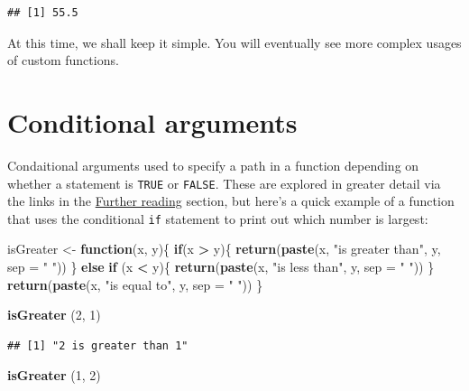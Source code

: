 \documentclass[
]{book}
\newenvironment{Shaded}{\begin{snugshade}}{\end{snugshade}}
\newcommand{\AttributeTok}[1]{\textcolor[rgb]{0.13,0.29,0.53}{#1}}
\newcommand{\ControlFlowTok}[1]{\textcolor[rgb]{0.13,0.29,0.53}{\textbf{#1}}}
\newcommand{\DecValTok}[1]{\textcolor[rgb]{0.00,0.00,0.81}{#1}}
\newcommand{\FunctionTok}[1]{\textcolor[rgb]{0.13,0.29,0.53}{\textbf{#1}}}
\newcommand{\NormalTok}[1]{#1}
\newcommand{\OtherTok}[1]{\textcolor[rgb]{0.56,0.35,0.01}{#1}}
\newcommand{\SpecialCharTok}[1]{\textcolor[rgb]{0.81,0.36,0.00}{\textbf{#1}}}
\newcommand{\StringTok}[1]{\textcolor[rgb]{0.31,0.60,0.02}{#1}}
\begin{document}
\begin{verbatim}
## [1] 55.5
\end{verbatim}

At this time, we shall keep it simple. You will eventually see more complex usages of custom functions.

\hypertarget{conditional-arguments}{%
\section{Conditional arguments}\label{conditional-arguments}}

Condaitional arguments used to specify a path in a function depending on whether a statement is \texttt{TRUE} or \texttt{FALSE}. These are explored in greater detail via the links in the \protect\hyperlink{further-reading}{Further reading} section, but here's a quick example of a function that uses the conditional \texttt{if} statement to print out which number is largest:

\begin{Shaded}
\begin{Highlighting}[]
\NormalTok{isGreater }\OtherTok{\textless{}{-}} \ControlFlowTok{function}\NormalTok{(x, y)\{}
  \ControlFlowTok{if}\NormalTok{(x }\SpecialCharTok{\textgreater{}}\NormalTok{ y)\{}
    \FunctionTok{return}\NormalTok{(}\FunctionTok{paste}\NormalTok{(x, }\StringTok{"is greater than"}\NormalTok{, y, }\AttributeTok{sep =} \StringTok{" "}\NormalTok{))}
\NormalTok{  \} }\ControlFlowTok{else} \ControlFlowTok{if}\NormalTok{ (x }\SpecialCharTok{\textless{}}\NormalTok{ y)\{ }
    \FunctionTok{return}\NormalTok{(}\FunctionTok{paste}\NormalTok{(x, }\StringTok{"is less than"}\NormalTok{, y, }\AttributeTok{sep =} \StringTok{" "}\NormalTok{))}
\NormalTok{  \}}
  \FunctionTok{return}\NormalTok{(}\FunctionTok{paste}\NormalTok{(x, }\StringTok{"is equal to"}\NormalTok{, y, }\AttributeTok{sep =} \StringTok{" "}\NormalTok{))}
\NormalTok{\}}

\FunctionTok{isGreater}\NormalTok{ (}\DecValTok{2}\NormalTok{, }\DecValTok{1}\NormalTok{)}
\end{Highlighting}
\end{Shaded}

\begin{verbatim}
## [1] "2 is greater than 1"
\end{verbatim}

\begin{Shaded}
\begin{Highlighting}[]
\FunctionTok{isGreater}\NormalTok{ (}\DecValTok{1}\NormalTok{, }\DecValTok{2}\NormalTok{)}
\end{Highlighting}
\end{Shaded}
\end{document}
